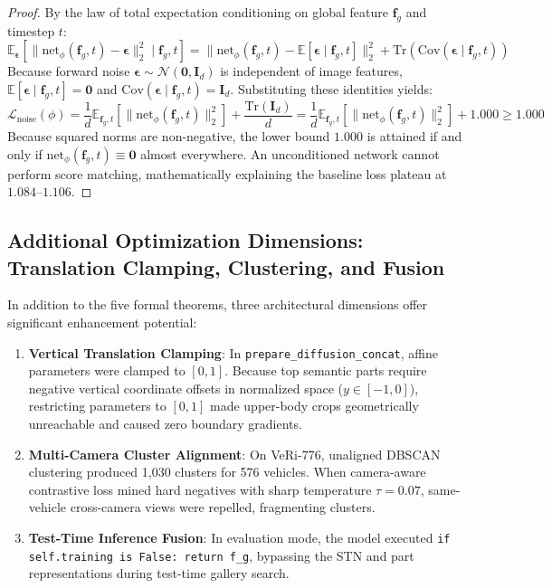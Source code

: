 \begin{proof}
By the law of total expectation conditioning on global feature $\mathbf{f}_g$ and timestep $t$:
\begin{equation}
\mathbb{E}_{\boldsymbol{\epsilon}}\left[ \|\mathrm{net}_\phi(\mathbf{f}_g, t) - \boldsymbol{\epsilon}\|_2^2 \mid \mathbf{f}_g, t \right] = \|\mathrm{net}_\phi(\mathbf{f}_g, t) - \mathbb{E}[\boldsymbol{\epsilon} \mid \mathbf{f}_g, t]\|_2^2 + \mathrm{Tr}\left(\mathrm{Cov}(\boldsymbol{\epsilon} \mid \mathbf{f}_g, t)\right)
\end{equation}
Because forward noise $\boldsymbol{\epsilon} \sim \mathcal{N}(\mathbf{0}, \mathbf{I}_d)$ is independent of image features, $\mathbb{E}[\boldsymbol{\epsilon} \mid \mathbf{f}_g, t] = \mathbf{0}$ and $\mathrm{Cov}(\boldsymbol{\epsilon} \mid \mathbf{f}_g, t) = \mathbf{I}_d$. Substituting these identities yields:
\begin{equation}
\mathcal{L}_{\text{noise}}(\phi) = \frac{1}{d}\mathbb{E}_{\mathbf{f}_g, t}\left[\|\mathrm{net}_\phi(\mathbf{f}_g, t)\|_2^2\right] + \frac{\mathrm{Tr}(\mathbf{I}_d)}{d} = \frac{1}{d}\mathbb{E}_{\mathbf{f}_g, t}\left[\|\mathrm{net}_\phi(\mathbf{f}_g, t)\|_2^2\right] + 1.000 \ge 1.000
\end{equation}
Because squared norms are non-negative, the lower bound $1.000$ is attained if and only if $\mathrm{net}_\phi(\mathbf{f}_g, t) \equiv \mathbf{0}$ almost everywhere. An unconditioned network cannot perform score matching, mathematically explaining the baseline loss plateau at $1.084$--$1.106$.
\end{proof}

\subsection{Additional Optimization Dimensions: Translation Clamping, Clustering, and Fusion}

In addition to the five formal theorems, three architectural dimensions offer significant enhancement potential:
\begin{enumerate}[leftmargin=*]
    \item \textbf{Vertical Translation Clamping}: In \texttt{prepare\_diffusion\_concat}, affine parameters were clamped to $[0, 1]$. Because top semantic parts require negative vertical coordinate offsets in normalized space ($y \in [-1, 0]$), restricting parameters to $[0, 1]$ made upper-body crops geometrically unreachable and caused zero boundary gradients.
    \item \textbf{Multi-Camera Cluster Alignment}: On VeRi-776, unaligned DBSCAN clustering produced 1,030 clusters for 576 vehicles. When camera-aware contrastive loss mined hard negatives with sharp temperature $\tau = 0.07$, same-vehicle cross-camera views were repelled, fragmenting clusters.
    \item \textbf{Test-Time Inference Fusion}: In evaluation mode, the model executed \texttt{if self.training is False: return f\_g}, bypassing the STN and part representations during test-time gallery search.
\end{enumerate}

